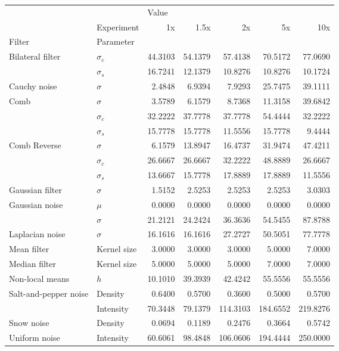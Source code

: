\begin{tabular}{llrrrrr}
\toprule
              & {} & \multicolumn{5}{l}{Value} \\
              & Experiment &      1x &    1.5x &       2x &       5x &      10x \\
Filter & Parameter &         &         &          &          &          \\
\midrule
\multirow{2}{*}{Bilateral filter} & $\sigma_c$ & 44.3103 & 54.1379 &  57.4138 &  70.5172 &  77.0690 \\
              & $\sigma_s$ & 16.7241 & 12.1379 &  10.8276 &  10.8276 &  10.1724 \\
\cline{1-7}
Cauchy noise & $\sigma$ &  2.4848 &  6.9394 &   7.9293 &  25.7475 &  39.1111 \\
\multirow{3}{*}{Comb} & $\sigma$ &  3.5789 &  6.1579 &   8.7368 &  11.3158 &  39.6842 \\
              & $\sigma_c$ & 32.2222 & 37.7778 &  37.7778 &  54.4444 &  32.2222 \\
              & $\sigma_s$ & 15.7778 & 15.7778 &  11.5556 &  15.7778 &   9.4444 \\
\cline{1-7}
\multirow{3}{*}{Comb Reverse} & $\sigma$ &  6.1579 & 13.8947 &  16.4737 &  31.9474 &  47.4211 \\
              & $\sigma_c$ & 26.6667 & 26.6667 &  32.2222 &  48.8889 &  26.6667 \\
              & $\sigma_s$ & 13.6667 & 15.7778 &  17.8889 &  17.8889 &  11.5556 \\
\cline{1-7}
Gaussian filter & $\sigma$ &  1.5152 &  2.5253 &   2.5253 &   2.5253 &   3.0303 \\
\multirow{2}{*}{Gaussian noise} & $\mu$ &  0.0000 &  0.0000 &   0.0000 &   0.0000 &   0.0000 \\
              & $\sigma$ & 21.2121 & 24.2424 &  36.3636 &  54.5455 &  87.8788 \\
\cline{1-7}
Laplacian noise & $\sigma$ & 16.1616 & 16.1616 &  27.2727 &  50.5051 &  77.7778 \\
Mean filter & Kernel size &  3.0000 &  3.0000 &   3.0000 &   5.0000 &   7.0000 \\
Median filter & Kernel size &  5.0000 &  5.0000 &   5.0000 &   7.0000 &   7.0000 \\
Non-local means & $h$ & 10.1010 & 39.3939 &  42.4242 &  55.5556 &  55.5556 \\
\multirow{2}{*}{Salt-and-pepper noise} & Density &  0.6400 &  0.5700 &   0.3600 &   0.5000 &   0.5700 \\
              & Intensity & 70.3448 & 79.1379 & 114.3103 & 184.6552 & 219.8276 \\
\cline{1-7}
Snow noise & Density &  0.0694 &  0.1189 &   0.2476 &   0.3664 &   0.5742 \\
Uniform noise & Intensity & 60.6061 & 98.4848 & 106.0606 & 194.4444 & 250.0000 \\
\bottomrule
\end{tabular}
